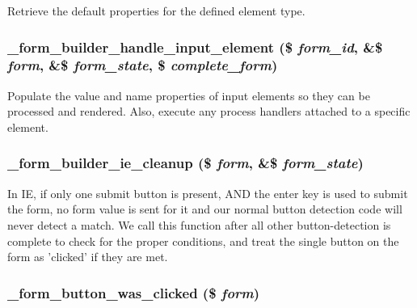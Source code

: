 Retrieve the default properties for the defined element type. \hypertarget{group__form__api_g609a63c66be83c0956899b3cfc665ff6}{
\subsubsection[{\_\-form\_\-builder\_\-handle\_\-input\_\-element}]{\setlength{\rightskip}{0pt plus 5cm}\_\-form\_\-builder\_\-handle\_\-input\_\-element (\$ {\em form\_\-id}, \/  \&\$ {\em form}, \/  \&\$ {\em form\_\-state}, \/  \$ {\em complete\_\-form})}}
\label{group__form__api_g609a63c66be83c0956899b3cfc665ff6}


Populate the value and name properties of input elements so they can be processed and rendered. Also, execute any process handlers attached to a specific element. \hypertarget{group__form__api_g7d997b259e62894fbfd69e9c4efcab99}{
\subsubsection[{\_\-form\_\-builder\_\-ie\_\-cleanup}]{\setlength{\rightskip}{0pt plus 5cm}\_\-form\_\-builder\_\-ie\_\-cleanup (\$ {\em form}, \/  \&\$ {\em form\_\-state})}}
\label{group__form__api_g7d997b259e62894fbfd69e9c4efcab99}


In IE, if only one submit button is present, AND the enter key is used to submit the form, no form value is sent for it and our normal button detection code will never detect a match. We call this function after all other button-detection is complete to check for the proper conditions, and treat the single button on the form as 'clicked' if they are met. \hypertarget{group__form__api_gd06129cdf0a951e8cce6d126d84acd32}{
\subsubsection[{\_\-form\_\-button\_\-was\_\-clicked}]{\setlength{\rightskip}{0pt plus 5cm}\_\-form\_\-button\_\-was\_\-clicked (\$ {\em form})}}
\label{group__form__api_gd06129cdf0a951e8cce6d126d84acd32}


